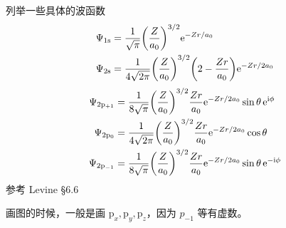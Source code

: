    列举一些具体的波函数
    \begin{align}
    \Psi_{1\mathrm{s}} &= \dfrac{1}{\sqrt{\pi}} \qty(\dfrac{Z}{a_0})^{3/2} \mathrm{e}^{-Zr/a_0} \\
    \Psi_{2\mathrm{s}} &= \dfrac{1}{4\sqrt{2\pi}} \qty(\dfrac{Z}{a_0})^{3/2} \qty(2-\dfrac{Zr}{a_0}) \mathrm{e}^{-Zr/2a_0}
    \end{align}
    \begin{align}
    \Psi_{2\mathrm{p}_{+1}} &= \dfrac{1}{8\sqrt{\pi}} \qty(\dfrac{Z}{a_0})^{3/2}  \dfrac{Zr}{a_0} \mathrm{e}^{-Zr/2a_0} \sin\theta \,\mathrm{e}^ {\mathrm{i}\phi} \\
    \Psi_{2\mathrm{p}_0} &= \dfrac{1}{4\sqrt{2\pi}} \qty(\dfrac{Z}{a_0})^{3/2}  \dfrac{Zr}{a_0} \mathrm{e}^{-Zr/2a_0} \cos\theta \\
    \Psi_{2\mathrm{p}_{-1}} &= \dfrac{1}{8\sqrt{\pi}} \qty(\dfrac{Z}{a_0})^{3/2}  \dfrac{Zr}{a_0} \mathrm{e}^{-Zr/2a_0} \sin\theta \,\mathrm{e}^ {-\mathrm{i}\phi}
    \end{align}
    参考 Levine \S 6.6

画图的时候，一般是画 $\mathrm{p}_x, \mathrm{p}_y, \mathrm{p}_z$，因为 $p_{-1}$ 等有虚数。

